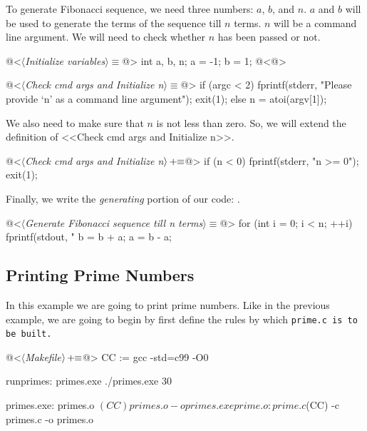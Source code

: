 To generate Fibonacci sequence, we need three numbers: $a$, $b$, and $n$. $a$ and $b$ will be used to generate
the terms of the sequence till $n$ terms. $n$ will be a command line argument. We will need to check whether
$n$ has been passed or not.

\begin{code}
@<$\langle$\textit{Initialize variables}$\rangle\equiv$@>
int a, b, n;
a = -1;
b = 1;
@<@>
\end{code}

\begin{code}
@<$\langle$\textit{Check cmd args and Initialize n}$\rangle\equiv$@>
if (argc < 2) {
    fprintf(stderr, "Please provide `n' as a command line argument\n");
    exit(1);
}
else {
    n = atoi(argv[1]);
}
\end{code}

We also need to make sure that $n$ is not less than zero. So, we will extend the definition of <<Check cmd
args and Initialize n>>.

\begin{oldcode}
@<$\langle$\textit{Check cmd args and Initialize n}$\rangle \thinspace +\!\!\equiv$@>
if (n < 0) {
    fprintf(stderr, "n >= 0\n");
    exit(1);
}
\end{oldcode}

Finally, we write the \textit{generating} portion of our code: .

\begin{code}
@<$\langle$\textit{Generate Fibonacci sequence till n terms}$\rangle\equiv$@>
for (int i = 0; i < n; ++i) {
    fprintf(stdout, "%
    b = b + a;
    a = b - a;
}
\end{code}

\subsection{Printing Prime Numbers}

In this example we are going to print prime numbers. Like in the previous example, we are going to begin by
first define the rules by which \tt prime.c \rm is to be built.

\begin{oldcode}
@<$\langle$\textit{Makefile}$\rangle \thinspace +\!\!\equiv$@>
CC := gcc -std=c99 -O0

runprimes: primes.exe
    ./primes.exe 30

primes.exe: primes.o
    $(CC) primes.o -o primes.exe

prime.o: prime.c
    $(CC) -c primes.c -o primes.o
\end{oldcode}

